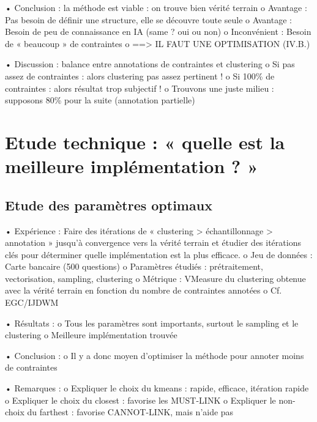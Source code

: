         •	Conclusion : la méthode est viable : on trouve bien vérité terrain
            o	Avantage : Pas besoin de définir une structure, elle se découvre toute seule
            o	Avantage : Besoin de peu de connaissance en IA (same ? oui ou non)
            o	Inconvénient : Besoin de « beaucoup » de contraintes
            o	==> IL FAUT UNE OPTIMISATION (IV.B.)

        •	Discussion : balance entre annotations de contraintes et clustering
            o	Si pas assez de contraintes : alors clustering pas assez pertinent !
            o	Si 100\% de contraintes : alors résultat trop subjectif !
            o	Trouvons une juste milieu : supposons 80\% pour la suite (annotation partielle)

    
    \section{Etude technique : « quelle est la meilleure implémentation ? »}

        \subsection{Etude des paramètres optimaux}

        •	Expérience : Faire des itérations de « clustering > échantillonnage > annotation » jusqu’à convergence vers la vérité terrain et étudier des itérations clés pour déterminer quelle implémentation est la plus efficace.
            o	Jeu de données : Carte bancaire (500 questions)
            o	Paramètres étudiés : prétraitement, vectorisation, sampling, clustering
            o	Métrique : VMeasure du clustering obtenue avec la vérité terrain en fonction du nombre de contraintes annotées
            o	Cf. EGC/IJDWM

        •	Résultats :
            o	Tous les paramètres sont importants, surtout le sampling et le clustering
            o	Meilleure implémentation trouvée

        •	Conclusion :
            o	Il y a donc moyen d’optimiser la méthode pour annoter moins de contraintes

        •	Remarques :
            o	Expliquer le choix du kmeans : rapide, efficace, itération rapide
            o	Expliquer le choix du closest : favorise les MUST-LINK
            o	Expliquer le non-choix du farthest : favorise CANNOT-LINK, mais n'aide pas

